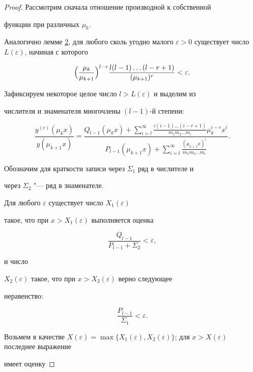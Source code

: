 \begin{proof} Рассмотрим сначала отношение производной к собственной

функции при различных $\mu_k$.



Аналогично лемме \hyperlink{napalk:lemma2}{2}, для любого сколь угодно малого $\varepsilon > 0$ существует число $L(\varepsilon)$, начиная с которого %

$$\Bigl(\frac{\mu_k}{\mu_{k+1}}\Bigr)^{l-r}\frac{l(l-1) \ldots

(l-r+1)}{(\mu_{k+1})^{r}} < \varepsilon.$$

Зафиксируем некоторое целое число $l > L(\varepsilon)$ и выделим из

числителя и знаменателя многочлены $(l-1)$-й степени:

\begin{equation}

\label{napal:eq6} \frac{y^{(r)}(\mu_k x)}{y(\mu_{k+1}

x)}=\frac{Q_{l-1}(\mu_k x) + \sum_{i=l}^\infty \frac{i(i-1)

\ldots (i-r+1)}{m_1 m_2 \ldots

m_i}\mu_k^{i-r}x^i}{P_{l-1}(\mu_{k+1} x) +

\sum_{i=l}^{\infty} \frac{(\mu_{k+1}x)^{i}}{m_1 m_2 \ldots

m_i}}.

\end{equation}

Обозначим для краткости записи через $\Sigma_1$ ряд в числителе и

через $\Sigma_2$ "--- ряд в знаменателе.



Для любого $\varepsilon$ существует число $X_1(\varepsilon)$

такое, что при $x > X_1(\varepsilon)$ выполняется оценка

$$\frac{Q_{l-1}}{P_{l-1} + \Sigma_2} < \varepsilon,$$ 

и число

$X_2(\varepsilon)$ такое, что при $x > X_2(\varepsilon)$ верно следующее

неравенство: 

$$\frac{P_{l-1}}{\Sigma_1} < \varepsilon.$$ 

Возьмем в качестве $X(\varepsilon) = \max \{X_1(\varepsilon),

X_2(\varepsilon)\}$;  для $x > X(\varepsilon)$ последнее выражение

имеет оценку


\end{proof}
